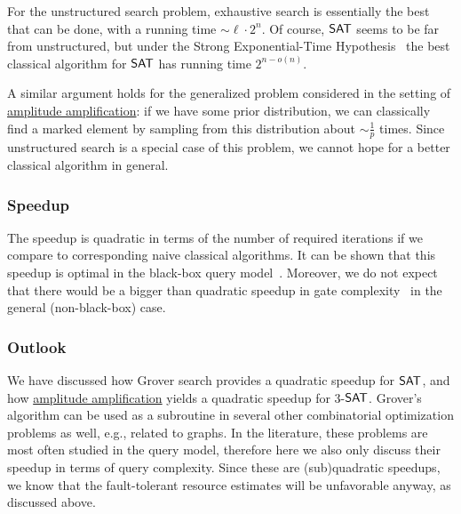 \begin{refsection}
	For the unstructured search problem, exhaustive search is essentially the best that can be done, with a running time $\sim\ell \cdot 2^n$. Of course, $\mathsf{SAT}$ seems to be far from  unstructured, but under the Strong Exponential-Time Hypothesis~\cite{impagliazzo2001WhichProbHasSETC,calabro2009SETH} the best classical algorithm for $\mathsf{SAT}$ has running time $2^{n-o(n)}$. 
	
	A similar argument holds for the generalized problem considered in the setting of \hyperref[prim:AmpAmp]{amplitude amplification}: if we have some prior distribution, we can classically find a marked element by sampling from this distribution about $\sim \frac{1}{p}$ times. Since unstructured search is a special case of this problem, we cannot hope for a better classical algorithm in general.
	
	
	\subsubsection*{Speedup}
	
	The speedup is quadratic in terms of the number of required iterations if we compare to corresponding naive classical algorithms. It can be shown that this speedup is optimal in the black-box query model~\cite{bennett1997QSearchLowerBound}. Moreover, we do not expect that there would be a bigger than quadratic speedup in gate complexity~\cite{buhrman2021QSETH} in the general (non-black-box) case.
	
	
	
	\subsubsection*{Outlook}
	
	We have discussed how Grover search provides a quadratic speedup for $\mathsf{SAT}$, and how \hyperref[prim:AmpAmp]{amplitude amplification} yields a quadratic speedup for 3-$\mathsf{SAT}$. 
	Grover's algorithm can be used as a subroutine in several other combinatorial optimization problems as well, e.g., related to graphs. In the literature, these problems are most often studied in the query model, therefore here we also only discuss their speedup in terms of query complexity. Since these are (sub)quadratic speedups, we know that the fault-tolerant resource estimates will be unfavorable anyway, as discussed above.
	

\end{refsection}
